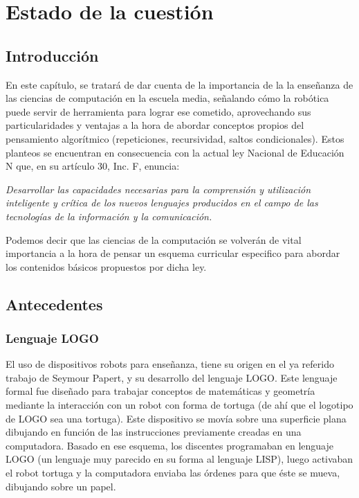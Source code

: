 \chapter{Estado de la cuestión}

\section{Introducción}

En este capítulo, se tratará de dar cuenta de la importancia de la la enseñanza de las ciencias de computación en la escuela media, señalando cómo la robótica puede servir de herramienta para lograr ese cometido, aprovechando sus particularidades y ventajas a la hora de abordar conceptos propios del pensamiento algorítmico (repeticiones, recursividad, saltos condicionales). Estos planteos se encuentran en consecuencia con la actual ley Nacional de Educación N que, en su artículo 30\grad, Inc. F, enuncia: 

\textit{Desarrollar  las  capacidades  necesarias  para  la  comprensión  y  utilización  inteligente  y  crítica  de  los  nuevos  lenguajes  producidos  en  el  campo  de  las tecnologías de la información y la comunicación.}

Podemos decir que las ciencias de la computación \citep[pág 4]{sadosky2013cc} se volverán de vital importancia a la hora de pensar un esquema curricular especifico para abordar los contenidos básicos propuestos por dicha ley.

\section{Antecedentes}

\subsection{Lenguaje LOGO}
El uso de dispositivos robots para enseñanza, tiene su origen en el ya referido trabajo de Seymour Papert, y su desarrollo del lenguaje LOGO. Este lenguaje formal \citep{giro_lenguaje_2015} fue diseñado para trabajar conceptos de matemáticas y geometría mediante la interacción con un robot con forma de tortuga (de ahí que el logotipo de LOGO sea una tortuga). Este dispositivo se movía sobre una superficie plana dibujando en función de las instrucciones previamente creadas en una computadora. Basado en ese esquema, los discentes programaban en lenguaje LOGO (un lenguaje muy parecido en su forma al lenguaje LISP), luego activaban el robot tortuga y la computadora enviaba las órdenes para que éste se mueva, dibujando sobre un papel. 

